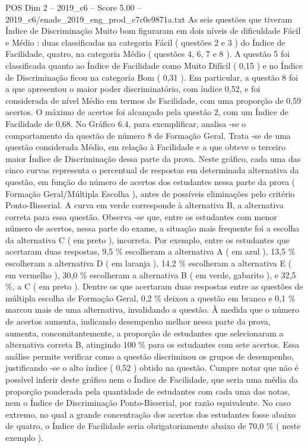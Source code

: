 \begin{textsample}{POS Dim 2 – 2019\_c6 – Score 5.00 – 2019\_c6/enade\_2019\_eng\_prod\_c7c0e9871a.txt}
As seis questões que tiveram Índice de Discriminação Muito bom figuraram em dois níveis de dificuldade Fácil e Médio : duas classificadas na categoria Fácil ( questões 2 e 3 ) do Índice de Facilidade, quatro, na categoria Médio ( questões 4, 6, 7 e 8 ).
A questão 5 foi classificada quanto ao Índice de Facilidade como Muito Difícil ( 0,15 ) e no Índice de Discriminação ficou na categoria Bom ( 0,31 ).
Em particular, a questão 8 foi a que apresentou o maior poder discriminatório, com índice 0,52, e foi considerada de nível Médio em termos de Facilidade, com uma proporção de 0,59 acertos.
O máximo de acertos foi alcançado pela questão 2, com um Índice de Facilidade de 0,68.
No Gráfico 6.4, para exemplificar, analisa -se o comportamento da questão de número 8 de Formação Geral.
Trata -se de uma questão considerada Médio, em relação à Facilidade e a que obteve o terceiro maior Índice de Discriminação dessa parte da prova.
Neste gráfico, cada uma das cinco curvas representa o percentual de respostas em determinada alternativa da questão, em função do número de acertos dos estudantes nessa parte da prova ( Formação Geral/Múltipla Escolha ), antes de possíveis eliminações pelo critério Ponto-Bisserial.
A curva em verde corresponde à alternativa B, a alternativa correta para essa questão.
Observa -se que, entre os estudantes com menor número de acertos, nessa parte do exame, a situação mais frequente foi a escolha da alternativa C ( em preto ), incorreta.
Por exemplo, entre os estudantes que acertaram duas respostas, 9,5 \% escolheram a alternativa A ( em azul ), 13,5 \% escolheram a alternativa D ( em laranja ), 14,2 \% escolheram a alternativa E ( em vermelho ), 30,0 \% escolheram a alternativa B ( em verde, gabarito ), e 32,5 \%, a C ( em preto ).
Dentre os que acertaram duas respostas entre as questões de múltipla escolha de Formação Geral, 0,2 \% deixou a questão em branco e 0,1 \% marcou mais de uma alternativa, invalidando a questão.
À medida que o número de acertos aumenta, indicando desempenho melhor nessa parte da prova, aumenta, concomitantemente, a proporção de estudantes que selecionaram a alternativa correta B, atingindo 100 \% para os estudantes com sete acertos.
Essa análise permite verificar como a questão discriminou os grupos de desempenho, justificando -se o alto índice ( 0,52 ) obtido na questão.
Cumpre notar que não é possível inferir deste gráfico nem o Índice de Facilidade, que seria uma média da proporção ponderada pela quantidade de estudantes com cada uma das notas, nem o Índice de Discriminação Ponto-Bisserial, por razão equivalente.
No caso extremo, no qual a grande concentração dos acertos dos estudantes fosse abaixo de quatro, o Índice de Facilidade seria obrigatoriamente abaixo de 70,0 \% ( neste exemplo ).

\end{textsample}
